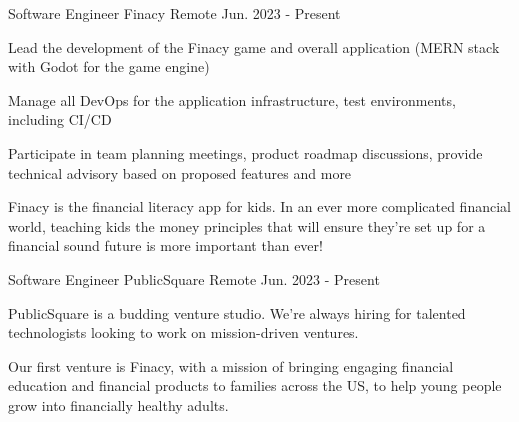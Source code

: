 

\begin{cventries}

\cventry
{Software Engineer} %
{Finacy} %
{Remote} %
{Jun. 2023 - Present} %
{
  \begin{cvitems} %
    \item {Lead the development of the Finacy game and overall application (MERN stack with Godot for the game engine)}
    \item {Manage all DevOps for the application infrastructure, test environments, including CI/CD}
    \item {Participate in team planning meetings, product roadmap discussions, provide technical advisory based on proposed features and more}
    \item {Finacy is the financial literacy app for kids. In an ever more complicated financial world, teaching kids the money principles that will ensure they're set up for a financial sound future is more important than ever!}
  \end{cvitems}
}

\cventry
{Software Engineer} %
{PublicSquare} %
{Remote} %
{Jun. 2023 - Present} %
{
  \begin{cvitems} %
    \item {PublicSquare is a budding venture studio. We're always hiring for talented technologists looking to work on mission-driven ventures.}
    \item {Our first venture is Finacy, with a mission of bringing engaging financial education and financial products to families across the US, to help young people grow into financially healthy adults.}
  \end{cvitems}
}




\end{cventries}
